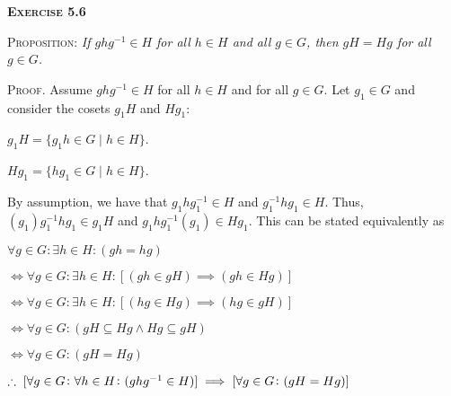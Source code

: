 \documentclass[12pt, a4paper]{article}
\begin{document}
\vspace{8mm}

\begin{flushleft}
\textsc{\textbf{Exercise 5.6}}
\end{flushleft}

\textsc{Proposition: } \textit{If $ghg^{-1}\in H$ for all $h\in H$ and all $g\in G$, then $gH=Hg$ for all $g\in G$.}

\vspace{6mm}

\textsc{Proof. }Assume $ghg^{-1}\in H$ for all $h\in H$ and for all $g\in G$. Let $g_1\in G$ and consider the cosets $g_1H$ and $Hg_1$:\par

\vspace{8mm}

\centerline{$g_1H=\{g_1h\in G\mid h\in H\}$.}

\newpage

\centerline{$Hg_1=\{hg_1\in G\mid h\in H\}$.}

\vspace{8mm}

By assumption, we have that $g_1hg^{-1}_1\in H$ and $g^{-1}_1hg_1\in H$. Thus, $(g_1)g^{-1}_1hg_1\in g_1H$ and $g_1hg^{-1}_1(g_1)\in Hg_1$. This can be stated equivalently as\par

\vspace{8mm}

\hspace{30mm}$\forall g\in G\colon\exists h\in H\colon (gh=hg)$\par
\vspace{2mm}
\hspace{30mm}$\Leftrightarrow \forall g\in G\colon\exists h\in H\colon [(gh\in gH)\implies (gh\in Hg)]$\par
\vspace{2mm}
\hspace{30mm}$\Leftrightarrow \forall g\in G\colon\exists h\in H\colon [(hg\in Hg)\implies (hg\in gH)]$\par
\vspace{2mm}
\hspace{30mm}$\Leftrightarrow \forall g\in G\colon (gH\subseteq Hg\wedge Hg\subseteq gH)$\par
\vspace{2mm}
\hspace{30mm}$\Leftrightarrow \forall g\in G\colon (gH=Hg)$\par
\vspace{2mm}
\hspace{30mm}$\therefore\hspace{1mm}[\forall g\in G\colon\forall h\in H\colon (ghg^{-1}\in H)]\implies[\forall g\in G\colon (gH=Hg)]$
\end{document}
